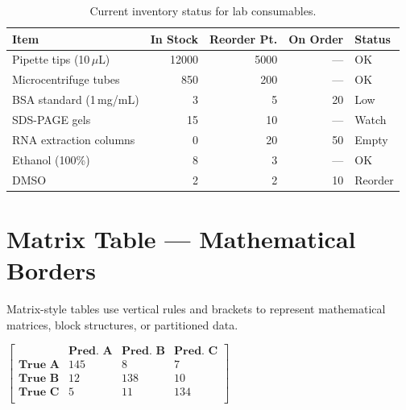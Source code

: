 \documentclass[
    language=english,
    doctype=article,
    institution=none,
]{../../omnilatex}
\begin{document}
\begin{table}[htbp]
    \centering
    \caption{Current inventory status for lab consumables.}
    \label{tab:inventory}
    \begin{tabular}{l r r r l}
        \toprule
        \rowcolor{headerblue!15}
        \textbf{Item} & \textbf{In Stock} & \textbf{Reorder Pt.} & \textbf{On Order} & \textbf{Status} \\
        \midrule
        Pipette tips (10\,$\mu$L)  & 12000 & 5000  & ---      & \cellcolor{accentgreen!15}OK \\
        Microcentrifuge tubes      & 850   & 200   & ---      & \cellcolor{accentgreen!15}OK \\
        BSA standard (1\,mg/mL)    & 3     & 5     & 20       & \cellcolor{accentred!15}Low \\
        SDS-PAGE gels              & 15    & 10    & ---      & \cellcolor{cellmid!50}Watch \\
        RNA extraction columns     & 0     & 20    & 50       & \cellcolor{accentred!15}Empty \\
        Ethanol (100\%)            & 8     & 3     & ---      & \cellcolor{accentgreen!15}OK \\
        DMSO                       & 2     & 2     & 10       & \cellcolor{accentorange!15}Reorder \\
        \bottomrule
    \end{tabular}
\end{table}

\section{Matrix Table — Mathematical Borders}
\label{sec:matrix}

Matrix-style tables use vertical rules and brackets to represent mathematical
matrices, block structures, or partitioned data.

\begin{table}[htbp]
    \centering
    \caption{Confusion matrix for three-class classification.}
    \label{tab:matrix}
    \renewcommand{\arraystretch}{1.5}
    $\left[\begin{array}{l|ccc}
        & \textbf{Pred. A} & \textbf{Pred. B} & \textbf{Pred. C} \\
        \hline
        \textbf{True A} & 145 &   8 &   7 \\
        \textbf{True B} &  12 & 138 &  10 \\
        \textbf{True C} &   5 &  11 & 134 \\
    \end{array}\right]$
\end{table}
\end{document}
